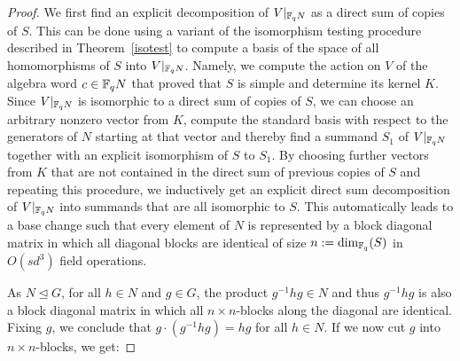 \begin{proof}
We first find an explicit decomposition of $V|_{\mathbb{F}_q N}$
as a direct sum of copies of $S$. This can be done using a variant
of the isomorphism testing procedure described in
Theorem~\ref{isotest} to compute a basis of the space of all
homomorphisms of $S$ into $V|_{\mathbb{F}_q N}$. Namely, we compute the action on
$V$ of the algebra word $c \in \mathbb{F}_q N$ that proved that $S$ is simple
and determine its kernel $K$. Since $V|_{\mathbb{F}_q N}$ is isomorphic to a direct
sum of copies of $S$, we can choose an arbitrary nonzero vector from $K$,
compute the standard basis with respect to the generators of $N$ starting
at that vector and thereby find a summand $S_1$ of $V|_{\mathbb{F}_q N}$ together
with an explicit isomorphism of $S$ to $S_1$. By choosing further vectors
from $K$ that are not contained in the direct sum of previous
copies of $S$ and repeating this procedure, we inductively get an explicit
direct sum decomposition of $V|_{\mathbb{F}_q N}$ into summands that are all
isomorphic to $S$. This automatically leads to a base change
such that every element of $N$ is represented by a block
diagonal matrix in which all diagonal blocks are identical of size $n :=
\dim_{\mathbb{F}_q}(S)$ in $O(sd^3)$ field operations.

As $N \unlhd G$, for all $h \in N$ and $g \in G$,
 the product $g^{-1}hg \in N$ and thus $g^{-1} h g$ is also 
a block diagonal matrix in which all $n \times n$-blocks along the diagonal
are identical. Fixing $g$, we conclude that $g\cdot (g^{-1}hg) = hg$ for all
$h \in N$. If we now cut $g$ into $n \times n$-blocks, we get:


\end{proof}
